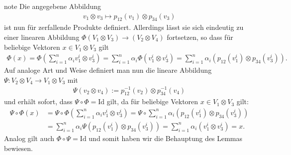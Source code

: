 \documentclass[letterpaper,10pt,english]{jupyterBook}
\begin{document}
\begin{sphinxadmonition}{note}
\sphinxAtStartPar
Die angegebene Abbildung
\begin{equation*}
\begin{split}v_1\otimes v_3 \mapsto p_{12}(v_1)\otimes p_{34}(v_3)\end{split}
\end{equation*}
\sphinxAtStartPar
ist nun  für zerfallende Produkte definiert.
Allerdings lässt sie sich eindeutig zu einer linearen Abbildung \(\Phi(V_1\otimes V_3)\to (V_2\otimes V_4)\) fortsetzen, so dass für beliebige Vektoren \(x \in V_1 \otimes V_3\) gilt
\begin{equation*}
\begin{split}\Phi(x) = \Phi(\sum_{i=1}^n \alpha_i v_1^i \otimes v_3^i) = 
\sum_{i=1}^n \alpha_i \Phi(v_1^i \otimes v_3^i) = 
\sum_{i=1}^n \alpha_i (p_{12}(v_1^i)\otimes p_{34}(v_3^i)).\end{split}
\end{equation*}
\sphinxAtStartPar
Auf analoge Art und Weise definiert man nun die lineare Abbildung \(\Psi \colon V_2 \otimes V_4 \rightarrow V_1 \otimes V_3\) mit
\begin{equation*}
\begin{split}\Psi(v_2\otimes v_4) := p_{12}^{-1}(v_2)\otimes p_{34}^{-1}(v_4)\end{split}
\end{equation*}
\sphinxAtStartPar
und erhält sofort, dass \(\Psi\circ\Phi = \mathrm{Id}\) gilt, da für beliebige Vektoren \(x \in V_1 \otimes V_3\) gilt:
\begin{equation*}
\begin{split}\Psi \circ \Phi(x) &= \Psi \circ \Phi(\sum_{i=1}^n \alpha_i v_1^i \otimes v_3^i) = \Psi \circ \sum_{i=1}^n \alpha_i (p_{12}(v_1^i)\otimes p_{34}(v_3^i)) \\
&= \sum_{i=1}^n \alpha_i \Psi(p_{12}(v_1^i)\otimes p_{34}(v_3^i)) = \sum_{i=1}^n \alpha_i (v_1^i \otimes v_3^i) = x.\end{split}
\end{equation*}
\sphinxAtStartPar
Analog gilt auch \(\Phi\circ\Psi = \mathrm{Id}\) und somit haben wir die Behauptung des Lemmas bewiesen.
\end{sphinxadmonition}
\end{document}
